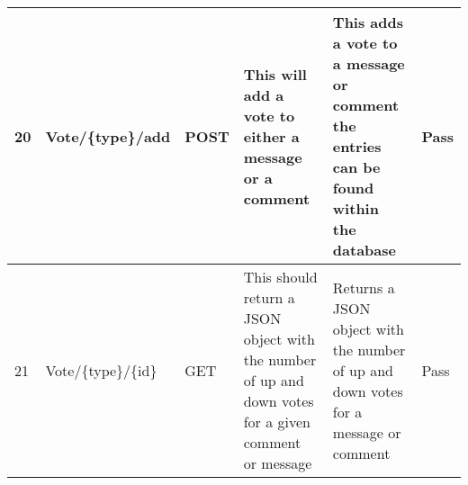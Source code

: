 \begin{landscape}
\newpage
\noindent
\begin{tabular}{|p{2cm}|p{4cm}|p{2cm}|p{6cm}|p{6cm}|p{1cm}|}
\hline
20 & Vote/\{type\}/add & POST & This will add a vote to either a message or a comment & This adds a vote to a message or comment the entries can be found within the database & Pass \\ \hline
21 & Vote/\{type\}/\{id\} & GET & This should return a JSON object with the number of up and down votes for a given comment or message & Returns a JSON object with the number of up and down votes for a message or comment & Pass \\ \hline
\end{tabular}

\end{landscape}